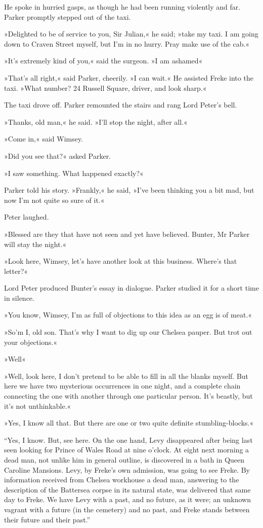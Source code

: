 He spoke in hurried gasps, as though he had been running violently and far. Parker promptly stepped out of the taxi.

»Delighted to be of service to you, Sir Julian,« he said; »take my taxi. I am going down to Craven Street myself, but I'm in no hurry. Pray make use of the cab.«

»It's extremely kind of you,« said the surgeon. »I am ashamed\longdash«

»That's all right,« said Parker, cheerily. »I can wait.« He assisted Freke into the taxi. »What number? 24 Russell Square, driver, and look sharp.«

The taxi drove off. Parker remounted the stairs and rang Lord Peter's bell.

»Thanks, old man,« he said. »I'll stop the night, after all.«

»Come in,« said Wimsey.

»Did you see that?« asked Parker.

»I saw something. What happened exactly?«

Parker told his story. »Frankly,« he said, »I've been thinking you a bit mad, but now I'm not quite so sure of it.«

Peter laughed.

»Blessed are they that have not seen and yet have believed. Bunter, Mr Parker will stay the night.«

»Look here, Wimsey, let's have another look at this business. Where's that letter?«

Lord Peter produced Bunter's essay in dialogue. Parker studied it for a short time in silence.

»You know, Wimsey, I'm as full of objections to this idea as an egg is of meat.«

»So'm I, old son. That's why I want to dig up our Chelsea pauper. But trot out your objections.«

»Well\longdash«

»Well, look here, I don't pretend to be able to fill in all the blanks myself. But here we have two mysterious occurrences in one night, and a complete chain connecting the one with another through one particular person. It's beastly, but it's not unthinkable.«

»Yes, I know all that. But there are one or two quite definite stumbling-blocks.«

“Yes, I know. But, see here. On the one hand, Levy disappeared after being last seen looking for Prince of Wales Road at nine o'clock. At eight next morning a dead man, not unlike him in general outline, is discovered in a bath in Queen Caroline Mansions. Levy, by Freke's own admission, was going to see Freke. By information received from Chelsea workhouse a dead man, answering to the description of the Battersea corpse in its natural state, was delivered that same day to Freke. We have Levy with a past, and no future, as it were; an unknown vagrant with a future (in the cemetery) and no past, and Freke stands between their future and their past.”

